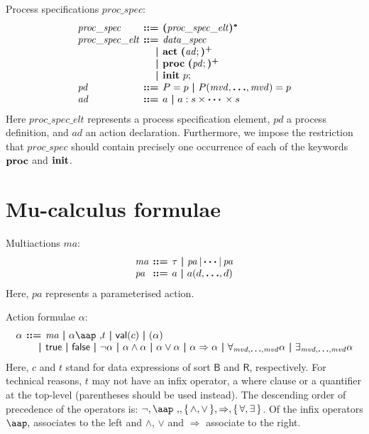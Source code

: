 \documentclass[a4paper,fleqn,10pt]{article}
\makeatletter
\newcommand{\f}[1]{\ensuremath{\mathit{#1}}}
\newcommand{\sbool}{\ensuremath{\mathsf{B}}}
\newcommand{\sreal}{\ensuremath{\mathsf{R}}}
\newenvironment{tightarray}[1]
  {\setlength{\arraycolsep}{2pt}%
   \begin{array}{@{}#1@{}}%
  }
  {\end{array}%
  }
\newcommand{\set}[1]{\ensuremath{\{\,#1\,\}}}
\newcommand{\at}[1]{\mbox{\aap ,} #1}
\newcommand{\limp}{\ensuremath{\Rightarrow}}
\newcommand{\mb}[1]{\text{\boldmath$#1$}}
\newcommand{\kwact}{{\bf act}}
\newcommand{\kwproc}{{\bf proc}}
\newcommand{\kwinit}{{\bf init}}
\makeatother
\begin{document}
Process specifications $\f{proc\_spec}$:
\[\begin{tightarray}{lrl}
\f{proc\_spec}      & \mb{::=} & \mb{(}\f{proc\_spec\_elt}\mb{)^{*}}\\
\f{proc\_spec\_elt} & \mb{::=} & \f{data\_spec}\\
                    & \mb{|}   & \kwact\ \mb{(}\f{ad};\mb{)^{+}}\\
                    & \mb{|}   & \kwproc\ \mb{(}\f{pd};\mb{)^{+}}\\
                    & \mb{|}   & \kwinit\ p;\\
\f{pd}              & \mb{::=} & P = p\ \mb{|}\ P(\f{mvd},\mb{\ldots},\f{mvd}) = p\\
\f{ad}              & \mb{::=} & a\ \mb{|}\ a: s \times \mb{\cdots} \times s
\end{tightarray}\]
Here $\f{proc\_spec\_elt}$ represents a process specification element, $\f{pd}$ a process definition, and $\f{ad}$ an action declaration. Furthermore, we impose the restriction that $\f{proc\_spec}$ should contain precisely one occurrence of each of the keywords $\kwproc$ and $\kwinit$.

\section{Mu-calculus formulae}

Multiactions $\f{ma}$:
\[\begin{tightarray}{lrl}
\f{ma} & \mb{::=} & \tau\ \mb{|}\ \f{pa}\,|\,\mb{\cdots} |\,\f{pa}\\
\f{pa} & \mb{::=} & a\ \mb{|}\ a(d,\mb{\ldots},d)
\end{tightarray}\]
Here, $\f{pa}$ represents a parameterised action.

Action formulae $\alpha$:
\[\begin{tightarray}{lrl}
\alpha & \mb{::=} & \f{ma}\ \mb{|}\
                    \alpha\at t\ \mb{|}\
                    \mathsf{val}(c)\ \mb{|}\
                    ( \alpha )\\
       & \mb{|}   & \mathsf{true}\ \mb{|}\
                    \mathsf{false}\ \mb{|}\
                    \neg \alpha\ \mb{|}\
                    \alpha \land \alpha\ \mb{|}\
                    \alpha \lor  \alpha\ \mb{|}\
                    \alpha \limp \alpha\ \mb{|}\
                    \forall_{\f{mvd},\mb{\ldots},\f{mvd}} \alpha\ \mb{|}\
                    \exists_{\f{mvd},\mb{\ldots},\f{mvd}} \alpha\\
\end{tightarray}\]
Here, $c$ and $t$ stand for data expressions of sort $\sbool$ and $\sreal$,
respectively.
For technical reasons, $t$ may not have an infix operator, a where
clause or a quantifier at the top-level (parentheses should be used
instead).
The descending order of precedence of the operators is: $\neg,
\at, \set{\land,\lor}, \limp, \set{\forall, \exists}$.  Of the infix operators
$\at$ associates to the left and $\land$, $\lor$ and $\limp$ associate to the
right.
\end{document}
